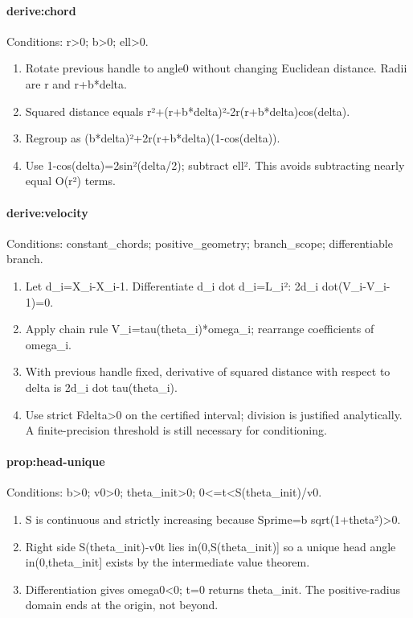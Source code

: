 \paragraph{derive:chord}
Conditions: r>0; b>0; ell>0.
\begin{enumerate}
\item Rotate previous handle to angle0 without changing Euclidean distance. Radii are r and r+b*delta.
\item Squared distance equals r²+(r+b*delta)²-2r(r+b*delta)cos(delta).
\item Regroup as (b*delta)²+2r(r+b*delta)(1-cos(delta)).
\item Use 1-cos(delta)=2sin²(delta/2); subtract ell². This avoids subtracting nearly equal O(r²) terms.
\end{enumerate}
\paragraph{derive:velocity}
Conditions: constant\_chords; positive\_geometry; branch\_scope; differentiable branch.
\begin{enumerate}
\item Let d\_i=X\_i-X\_i-1. Differentiate d\_i dot d\_i=L\_i²: 2d\_i dot(V\_i-V\_i-1)=0.
\item Apply chain rule V\_i=tau(theta\_i)*omega\_i; rearrange coefficients of omega\_i.
\item With previous handle fixed, derivative of squared distance with respect to delta is 2d\_i dot tau(theta\_i).
\item Use strict Fdelta>0 on the certified interval; division is justified analytically. A finite-precision threshold is still necessary for conditioning.
\end{enumerate}
\paragraph{prop:head-unique}
Conditions: b>0; v0>0; theta\_init>0; 0<=t<S(theta\_init)/v0.
\begin{enumerate}
\item S is continuous and strictly increasing because Sprime=b sqrt(1+theta²)>0.
\item Right side S(theta\_init)-v0t lies in(0,S(theta\_init)] so a unique head angle in(0,theta\_init] exists by the intermediate value theorem.
\item Differentiation gives omega0<0; t=0 returns theta\_init. The positive-radius domain ends at the origin, not beyond.
\end{enumerate}
